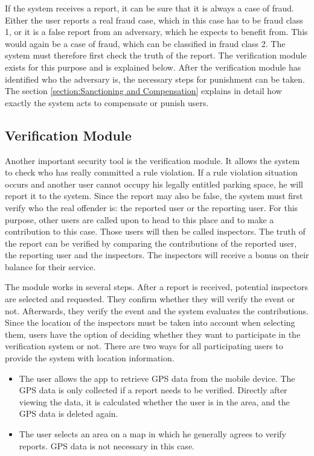 If the system receives a report, it can be sure that it is always a case of fraud. Either the user reports a real fraud case, which in this case has to be fraud class 1, or it is a false report from an adversary, which he expects to benefit from. This would again be a case of fraud, which can be classified in fraud class 2. The system must therefore first check the truth of the report. The verification module exists for this purpose and is explained below. After the verification module has identified who the adversary is, the necessary steps for punishment can be taken. The section \ref{section:Sanctioning and Compensation}  explains in detail how exactly the system acts to compensate or punish users.

\subsection{Verification Module}\label{section:Verification Module} Another important security tool is the verification module. It allows the system to check who has really committed a rule violation. If a rule violation situation occurs and another user cannot occupy his legally entitled parking space, he will report it to the system. Since the report may also be false, the system must first verify who the real offender is: the reported user or the reporting user. For this purpose, other users are called upon to head to this place and to make a contribution to this case. Those users will then be called inspectors. The truth of the report can be verified by comparing the contributions of the reported user, the reporting user and the inspectors. The inspectors will receive a bonus on their balance for their service.

The module works in several steps. After a report is received, potential inspectors are selected and requested. They confirm whether they will verify the event or not. Afterwards, they verify the event and the system evaluates the contributions. \\

Since the location of the inspectors must be taken into account when selecting them, users have the option of deciding whether they want to participate in the verification system or not. There are two ways for all participating users to provide the system with location information. 
\begin{itemize}
\item The user allows the app to retrieve GPS data from the mobile device. The GPS data is only collected if a report needs to be verified. Directly after viewing the data, it is calculated whether the user is in the area, and the GPS data is deleted again.
\item The user selects an area on a map in which he generally agrees to verify reports. GPS data is not necessary in this case.
\end{itemize}


